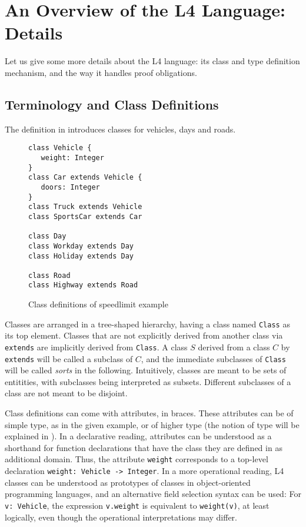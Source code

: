 \section{An Overview of the L4 Language: Details}\label{sec:l4_language_app}

Let us give some more details about the L4 language: its class and type
definition mechanism, and the way it handles proof obligations.

\subsection{Terminology and Class Definitions}\label{sec:classdefs}

The definition in  introduces classes for vehicles, days
and roads. 

\begin{figure}[h!]
\begin{lstlisting}
class Vehicle {
   weight: Integer
}
class Car extends Vehicle {
   doors: Integer
}
class Truck extends Vehicle
class SportsCar extends Car

class Day
class Workday extends Day
class Holiday extends Day

class Road
class Highway extends Road
\end{lstlisting}
  \caption{Class definitions of speedlimit example}\label{fig:classdefs}
\end{figure}

Classes are arranged in a tree-shaped hierarchy, having a class named
\texttt{Class} as its top element. Classes that are not explicitly derived
from another class via \texttt{extends} are implicitly derived from
\texttt{Class}. A class $S$ derived from a class $C$ by \texttt{extends} will
be called a subclass of $C$, and the immediate subclasses of \texttt{Class}
will be called \emph{sorts} in the following. Intuitively, classes are meant
to be sets of entitities, with subclasses being interpreted as
subsets. Different subclasses of a class are not meant to be disjoint.

Class definitions can come with attributes, in braces. These attributes can be
of simple type, as in the given example, or of higher type (the notion of type
will be explained in ). In a declarative reading,
attributes can be understood as a shorthand for function declarations that
have the class they are defined in as additional domain. Thus, the attribute
\texttt{weight} corresponds to a top-level declaration \texttt{weight: Vehicle
  -> Integer}. In a more operational reading, L4 classes can be understood as
prototypes of classes in object-oriented programming languages, and an
alternative field selection syntax can be used: For \texttt{v: Vehicle}, the
expression \texttt{v.weight} is equivalent to \texttt{weight(v)}, at least
logically, even though the operational interpretations may differ.


